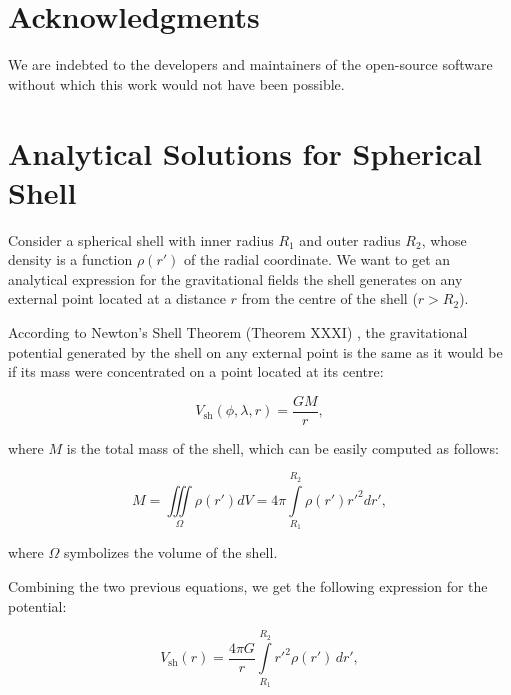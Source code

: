 \documentclass[extra, referee]{gji}
\begin{document}

\section{Acknowledgments}

We are indebted to the developers and maintainers of the open-source software without
which this work would not have been possible.





\appendix

\section{Analytical Solutions for Spherical Shell}
\label{sec:shell}

Consider a spherical shell with inner radius $R_1$ and outer radius $R_2$,
whose density is a function $\rho(r')$ of the radial coordinate.
We want to get an analytical expression for the gravitational fields the shell generates
on any external point located at a distance $r$ from the centre of the shell
($r > R_2$).

According to Newton's Shell Theorem (Theorem XXXI)
\citep{Chandrasekhar1995, Binney2008}, the gravitational potential generated by the
shell on any external point is the same as it would be if its mass were concentrated on
a point located at its centre:

\begin{equation}
    V_\text{sh}(\phi, \lambda, r) = \frac{GM}{r},
\end{equation}

\noindent where $M$ is the total mass of the shell, which can be easily computed as
follows:

\begin{equation}
    M =
    \iiint\limits_{\Omega} \rho(r') dV =
    4\pi \int\limits_{R_1}^{R_2} \rho(r') {r'}^2 dr',
\end{equation}

\noindent where $\Omega$ symbolizes the volume of the shell.

Combining the two previous equations, we get the following expression for the potential:

\begin{equation}
    V_\text{sh}(r) = \frac{4\pi G}{r}
    \int\limits_{R_1}^{R_2} {r'}^2 \rho(r') \, dr',
\label{eq:shell-pot}
\end{equation}
\end{document}
